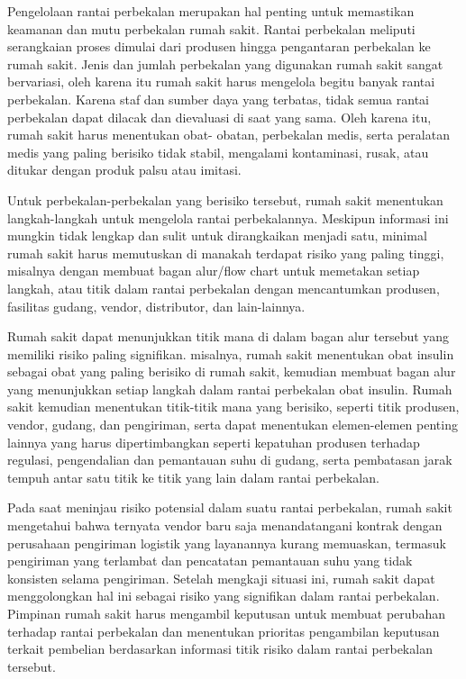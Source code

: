 \documentclass[
]{book}
\begin{document}
Pengelolaan rantai perbekalan merupakan hal penting untuk memastikan keamanan dan mutu perbekalan rumah sakit. Rantai perbekalan meliputi serangkaian proses dimulai dari produsen hingga pengantaran perbekalan ke rumah sakit. Jenis dan jumlah perbekalan yang digunakan rumah sakit sangat bervariasi, oleh karena itu rumah sakit harus mengelola begitu banyak rantai perbekalan. Karena staf dan sumber daya yang terbatas, tidak semua rantai perbekalan dapat dilacak dan dievaluasi di saat yang sama. Oleh karena itu, rumah sakit harus menentukan obat- obatan, perbekalan medis, serta peralatan medis yang paling berisiko tidak stabil, mengalami kontaminasi, rusak, atau ditukar dengan produk palsu atau imitasi.

Untuk perbekalan-perbekalan yang berisiko tersebut, rumah sakit menentukan langkah-langkah untuk mengelola rantai perbekalannya. Meskipun informasi ini mungkin tidak lengkap dan sulit untuk dirangkaikan menjadi satu, minimal rumah sakit harus memutuskan di manakah terdapat risiko yang paling tinggi, misalnya dengan membuat bagan alur/flow chart untuk memetakan setiap langkah, atau titik dalam rantai perbekalan dengan mencantumkan produsen, fasilitas gudang, vendor, distributor, dan lain-lainnya.

Rumah sakit dapat menunjukkan titik mana di dalam bagan alur tersebut yang memiliki risiko paling signifikan. misalnya, rumah sakit menentukan obat insulin sebagai obat yang paling berisiko di rumah sakit, kemudian membuat bagan alur yang menunjukkan setiap langkah dalam rantai perbekalan obat insulin. Rumah sakit kemudian menentukan titik-titik mana yang berisiko, seperti titik produsen, vendor, gudang, dan pengiriman, serta dapat menentukan elemen-elemen penting lainnya yang harus dipertimbangkan seperti kepatuhan produsen terhadap regulasi, pengendalian dan pemantauan suhu di gudang, serta pembatasan jarak tempuh antar satu titik ke titik yang lain dalam rantai perbekalan.

Pada saat meninjau risiko potensial dalam suatu rantai perbekalan, rumah sakit mengetahui bahwa ternyata vendor baru saja menandatangani kontrak dengan perusahaan pengiriman logistik yang layanannya kurang memuaskan, termasuk pengiriman yang terlambat dan pencatatan pemantauan suhu yang tidak konsisten selama pengiriman. Setelah mengkaji situasi ini, rumah sakit dapat menggolongkan hal ini sebagai risiko yang signifikan dalam rantai perbekalan. Pimpinan rumah sakit harus mengambil keputusan untuk membuat perubahan terhadap rantai perbekalan dan menentukan prioritas pengambilan keputusan terkait pembelian berdasarkan informasi titik risiko dalam rantai perbekalan tersebut.
\end{document}
